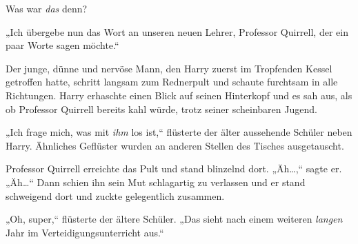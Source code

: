 Was war \emph{das} denn?

„Ich übergebe nun das Wort an unseren neuen Lehrer, Professor Quirrell, der ein paar Worte sagen möchte.“

Der junge, dünne und nervöse Mann, den Harry zuerst im Tropfenden Kessel getroffen hatte, schritt langsam zum Rednerpult und schaute furchtsam in alle Richtungen. Harry erhaschte einen Blick auf seinen Hinterkopf und es sah aus, als ob Professor Quirrell bereits kahl würde, trotz seiner scheinbaren Jugend.

„Ich frage mich, was mit \emph{ihm} los ist,“ flüsterte der älter aussehende Schüler neben Harry. Ähnliches Geflüster wurden an anderen Stellen des Tisches ausgetauscht.

Professor Quirrell erreichte das Pult und stand blinzelnd dort. „Äh…,“ sagte er. „Äh…“ Dann schien ihn sein Mut schlagartig zu verlassen und er stand schweigend dort und zuckte gelegentlich zusammen.

„Oh, super,“ flüsterte der ältere Schüler. „Das sieht nach einem weiteren \emph{langen} Jahr im Verteidigungsunterricht aus.“

